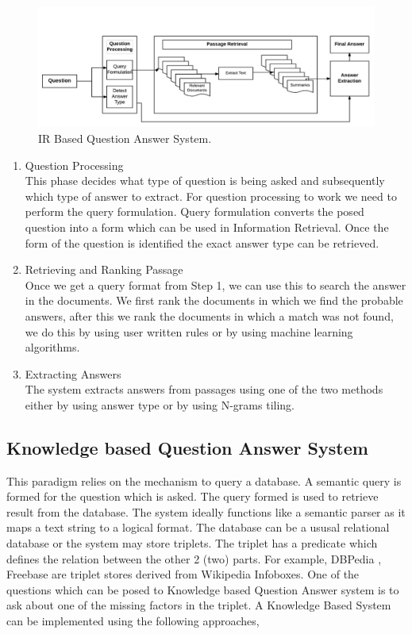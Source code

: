 \begin{figure}[htb]
\centering
\includegraphics[scale=0.8]{images/IR_BasedQA.jpg}
\caption{IR Based Question Answer System.} 
\label{fig:IR_BasedQA}
\end{figure}

\begin{enumerate}	
\item Question Processing \\
This phase decides what type of question is being asked and subsequently which type of answer to 
extract. For question processing to work we need to perform the query formulation. Query formulation converts the posed question into a form which can be used in Information Retrieval. Once the form of the question is identified the exact answer type can be retrieved. 
	
\item Retrieving and Ranking Passage \\
Once we get a query format from Step 1, we can use this to search the answer in the documents.
We first rank the documents in which we find the probable answers, after this we rank the documents in which a match was not found, we do this by using user written rules or by using machine learning algorithms.

\break
\item Extracting Answers \\
The system extracts answers from passages using one of the two methods either by using answer type or by using N-grams tiling.
\end{enumerate}

\subsection{Knowledge based Question Answer System}
This paradigm relies on the mechanism to query a database. A semantic query is formed for the question which is asked. The query formed is used to retrieve result from the database. The system ideally functions like a semantic parser as it maps a text string to a logical format. The database can be a ususal relational database or the system may store triplets. The triplet has a predicate which defines the relation between the other 2 (two) parts. For example, DBPedia \cite{auer2007dbpedia}, Freebase \cite {bollacker2008freebase} are triplet stores derived from Wikipedia Infoboxes. One of the questions which can be posed to Knowledge based Question Answer system is to ask about one of the missing factors in the triplet. A Knowledge Based System can be implemented using the following approaches,

